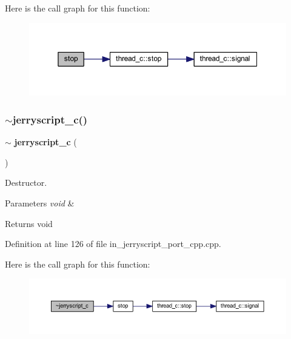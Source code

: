 Here is the call graph for this function\+:
\nopagebreak
\begin{figure}[H]
\begin{center}
\leavevmode
\includegraphics[width=350pt]{group___port_ga317e8c9771295ad8aba4e6b3fe79904a_cgraph}
\end{center}
\end{figure}
\mbox{\label{group___port_gada28d8430f0b476ab1f392245b2b5fc4}} 
\subsubsection{$\sim$jerryscript\_c()}
{\footnotesize\ttfamily $\sim$\textbf{ jerryscript\+\_\+c} (\begin{DoxyParamCaption}\item[{void}]{ }\end{DoxyParamCaption})}



Destructor. 


\begin{DoxyParams}{Parameters}
{\em void} & \\
\hline
\end{DoxyParams}
\begin{DoxyReturn}{Returns}
void 
\end{DoxyReturn}


Definition at line 126 of file in\+\_\+jerryscript\+\_\+port\+\_\+cpp.\+cpp.

Here is the call graph for this function\+:
\nopagebreak
\begin{figure}[H]
\begin{center}
\leavevmode
\includegraphics[width=350pt]{group___port_gada28d8430f0b476ab1f392245b2b5fc4_cgraph}
\end{center}
\end{figure}


